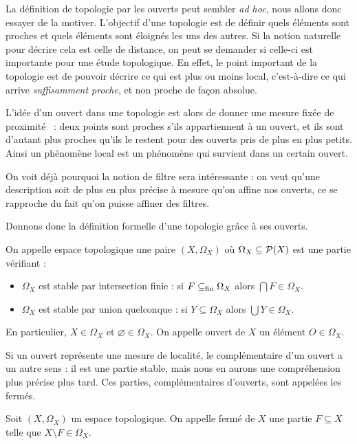 La définition de topologie par les ouverts peut sembler \textit{ad hoc}, nous
allons donc essayer de la motiver. L'objectif d'une topologie est de définir
quels éléments sont proches et quels éléments sont éloignés les uns des autres.
Si la notion naturelle pour décrire cela est celle de distance, on peut se
demander si celle-ci est importante pour une étude topologique. En effet, le
point important de la topologie est de pouvoir décrire ce qui est plus ou moins
local, c'est-à-dire ce qui arrive \textit{suffisamment proche}, et non proche de
façon absolue.

L'idée d'un ouvert dans une topologie est alors de donner une mesure fixée de
proximité~ : deux points sont proches s'ils appartiennent à un ouvert, et ils
sont d'autant plus proches qu'ils le restent pour des ouverts pris de plus en
plus petits. Ainsi un phénomène local est un phénomène qui survient dans un
certain ouvert.

On voit déjà pourquoi la notion de filtre sera intéressante : on veut qu'une
description soit de plus en plus précise à mesure qu'on affine nos ouverts,
ce se rapproche du fait qu'on puisse affiner des filtres.

Donnons donc la définition formelle d'une topologie grâce à ses ouverts.

\begin{definition}
  On appelle espace topologique une paire $(X,\Omega_X)$ où
  $\Omega_X\subseteq\mathcal{P}(X)$ est une partie vérifiant :
  \begin{itemize}
  \item $\Omega_X$ est stable par intersection finie : si $F\subseteq_{\mathrm{fin}} \Omega_X$
    alors $\bigcap F \in \Omega_X$.
  \item $\Omega_X$ est stable par union quelconque : si $Y\subseteq \Omega_X$
    alors $\bigcup Y \in \Omega_X$.
  \end{itemize}

  En particulier, $X\in \Omega_X$ et $\varnothing\in \Omega_X$. On appelle
  ouvert de $X$ un élément $O\in\Omega_X$.
\end{definition}

Si un ouvert représente une mesure de localité, le complémentaire d'un ouvert a
un autre sens : il est une partie stable, mais nous en aurons une compréhension
plus précise plus tard. Ces parties, complémentaires d'ouverts, sont appelées
les fermés.

\begin{definition}[Fermé]
  Soit $(X,\Omega_X)$ un espace topologique. On appelle fermé de $X$ une partie
  $F\subseteq X$ telle que $X\setminus F \in \Omega_X$.
\end{definition}

